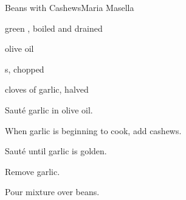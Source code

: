 \begin{recipe}{Beans with Cashews}{Maria Masella}{}

\begin{ingredients}
\item green , boiled and drained
\item olive oil
\item {}s, chopped
\item cloves of garlic, halved
\end{ingredients}

\begin{directions}
\item Sauté garlic in olive oil.
\item When garlic is beginning to cook, add cashews.
\item Sauté until garlic is golden.
\item Remove garlic.
\item Pour mixture over beans.
\end{directions}

\end{recipe}
